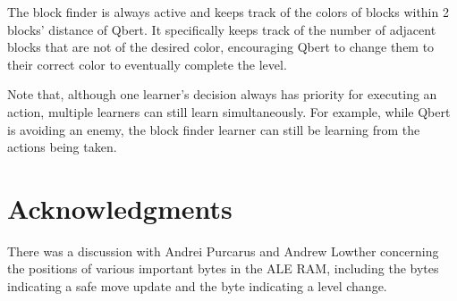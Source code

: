 \documentclass[a4paper,titlepage]{article}
\begin{document}
	The block finder is always active and keeps track of the colors of blocks within 2 blocks' distance of Qbert. It specifically keeps track of the number of adjacent blocks that are not of the desired color, encouraging Qbert to change them to their correct color to eventually complete the level.
	
	Note that, although one learner's decision always has priority for executing an action, multiple learners can still learn simultaneously. For example, while Qbert is avoiding an enemy, the block finder learner can still be learning from the actions being taken.
	
	
	
	\section*{Acknowledgments}
	
	There was a discussion with Andrei Purcarus and Andrew Lowther concerning the positions of various important bytes in the ALE RAM, including the bytes indicating a safe move update and the byte indicating a level change.
	
	
	
	{}
	
\end{document}
